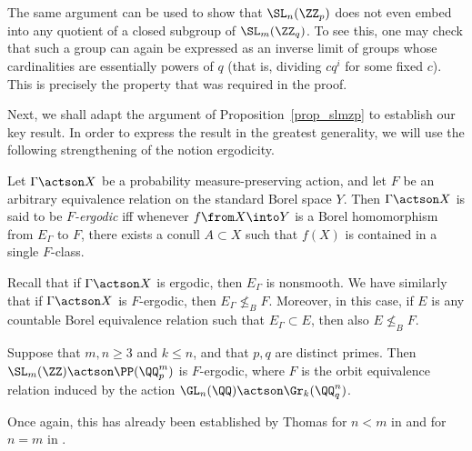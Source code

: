 \documentclass[oneside,leqno,11pt]{amsart}
\begin{document}
\begin{rem}
  The same argument can be used to show that $\SL_n(\ZZ_p)$ does not
  even embed into any quotient of a closed subgroup of $\SL_m(\ZZ_q)$.
  To see this, one may check that such a group can again be
  expressed as an inverse limit of groups whose cardinalities are
  essentially powers of $q$ (that is, dividing $cq^i$ for some fixed
  $c$).  This is precisely the property that was required in the
  proof.
\end{rem}

Next, we shall adapt the argument of Proposition~\ref{prop_slmzp} to
establish our key result.  In order to express the result in the
greatest generality, we will use the following strengthening of the
notion ergodicity.

\begin{defn}
  Let $\Gamma\actson X$ be a probability measure-preserving action,
  and let $F$ be an arbitrary equivalence relation on the standard
  Borel space $Y$.  Then $\Gamma\actson X$ is said to be
  \emph{$F$-ergodic} iff whenever $f\from X\into Y$ is a Borel
  homomorphism from $E_\Gamma$ to $F$, there exists a conull $A\subset
  X$ such that $f(X)$ is contained in a single $F$-class.
\end{defn}

Recall that if $\Gamma\actson X$ is ergodic, then $E_\Gamma$ is
nonsmooth.  We have similarly that if $\Gamma\actson X$ is
$F$-ergodic, then $E_\Gamma\not\leq_BF$.  Moreover, in this case, if
$E$ is any countable Borel equivalence relation such that
$E_\Gamma\subset E$, then also $E\not\leq_BF$.

\begin{thm}
  \label{thm_glnq}
  Suppose that $m,n\geq3$ and $k\leq n$, and that $p,q$ are distinct
  primes.  Then $\SL_m(\ZZ)\actson\PP(\QQ_p^m)$ is $F$-ergodic, where
  $F$ is the orbit equivalence relation induced by the action
  $\GL_n(\QQ)\actson\Gr_k(\QQ_q^n)$.
\end{thm}

Once again, this has already been established by Thomas for $n<m$ in
\cite[Theorem~2.4]{torsionfree} and for $n=m$ in
\cite[Theorem~4.7]{plocal}.
\end{document}
